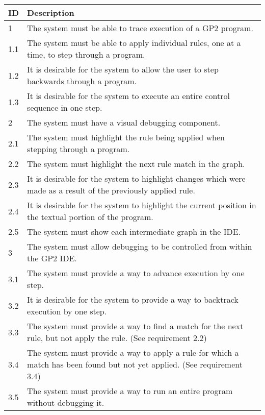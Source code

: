 \documentclass[authoryearcitations]{UoYCSproject}
\begin{document}
\begin{table}[tbp]
    \begin{tabularx}{\linewidth}{|l|X|}
        \hline
        \textbf{ID} & \textbf{Description} \\
        \hline
        1    &  The system must be able to trace execution of a GP2 program. \\ \hline
        1.1  &  The system must be able to apply individual rules, one at a time,
                to step through a program. \\ \hline
        1.2  &  It is desirable for the system to allow the user to step
                backwards through a program. \\ \hline
        1.3  &  It is desirable for the system to execute an entire control sequence
                in one step. \\ \hline

        2    &  The system must have a visual debugging component. \\ \hline
        2.1  &  The system must highlight the rule being applied when stepping
                through a program. \\ \hline
        2.2  &  The system must highlight the next rule match in the graph. \\ \hline
        2.3  &  It is desirable for the system to highlight changes which were
                made as a result of the previously applied rule. \\ \hline
        2.4  &  It is desirable for the system to highlight the current position
                in the textual portion of the program. \\ \hline
        2.5  &  The system must show each intermediate graph in the IDE. \\ \hline

        3    &  The system must allow debugging to be controlled from within the
                GP2 IDE. \\ \hline
        3.1  &  The system must provide a way to advance execution by one step. \\ \hline
        3.2  &  It is desirable for the system to provide a way to backtrack
                execution by one step. \\ \hline
        3.3  &  The system must provide a way to find a match for the next rule,
                but not apply the rule. (See requirement 2.2) \\ \hline
        3.4  &  The system must provide a way to apply a rule for which a match
                has been found but not yet applied. (See requirement 3.4) \\ \hline
        3.5  &  The system must provide a way to run an entire program without
                debugging it. \\ \hline


\end{tabularx}
\end{table}
\end{document}
